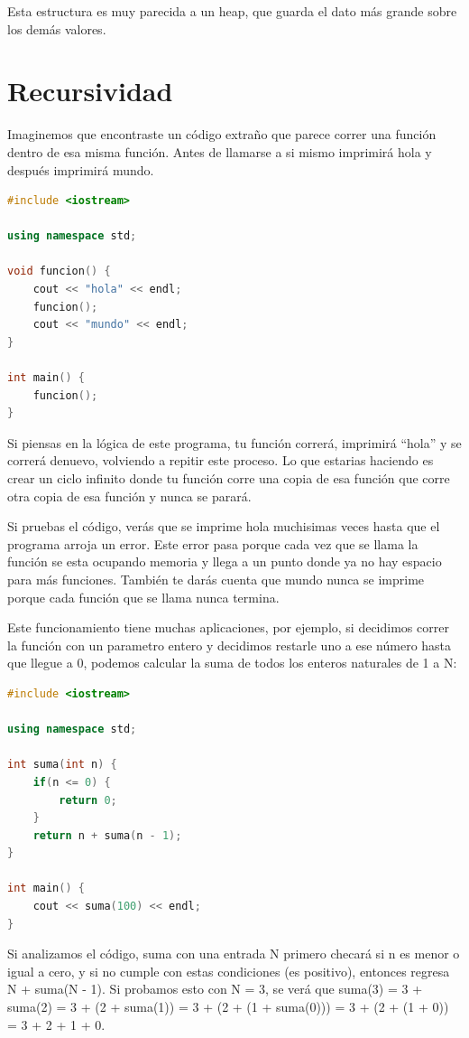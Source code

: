 \documentclass{article}
\begin{document}
Esta estructura es muy parecida a un heap, que guarda el dato más grande sobre los demás valores.

\section{Recursividad}

Imaginemos que encontraste un código extraño que parece correr una función dentro de esa misma función. Antes de llamarse a si mismo imprimirá hola y después imprimirá mundo.

\begin{lstlisting}[language=C++, title=Funciones]
#include <iostream>

using namespace std;

void funcion() {
	cout << "hola" << endl;
	funcion();
	cout << "mundo" << endl;
}

int main() {
	funcion();
}
\end{lstlisting}

Si piensas en la lógica de este programa, tu función correrá, imprimirá ``hola'' y se correrá denuevo, volviendo a repitir este proceso. Lo que estarias haciendo es crear un ciclo infinito donde tu función corre una copia de esa función que corre otra copia de esa función y nunca se parará.

Si pruebas el código, verás que se imprime hola muchisimas veces hasta que el programa arroja un error. Este error pasa porque cada vez que se llama la función se esta ocupando memoria y llega a un punto donde ya no hay espacio para más funciones. También te darás cuenta que mundo nunca se imprime porque cada función que se llama nunca termina.

Este funcionamiento tiene muchas aplicaciones, por ejemplo, si decidimos correr la función con un parametro entero y decidimos restarle uno a ese número hasta que llegue a 0, podemos calcular la suma de todos los enteros naturales de 1 a N:

\begin{lstlisting}[language=C++, title=Suma de enteros]
#include <iostream>

using namespace std;

int suma(int n) {
	if(n <= 0) {
		return 0;
	}
	return n + suma(n - 1);
}

int main() {
	cout << suma(100) << endl;
}
\end{lstlisting}

Si analizamos el código, suma con una entrada N primero checará si n es menor o igual a cero, y si no cumple con estas condiciones (es positivo), entonces regresa N + suma(N - 1). Si probamos esto con N = 3, se verá que suma(3) = 3 + suma(2) = 3 + (2 + suma(1)) = 3 + (2 + (1 + suma(0))) = 3 + (2 + (1 + 0)) = 3 + 2 + 1 + 0.
\end{document}
